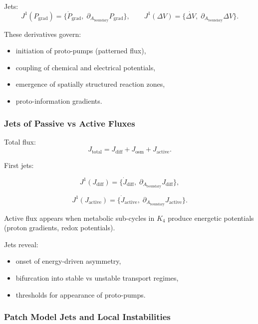 Jets:
\[
J^1(P_{\mathrm{grad}})=
\{\dot{P}_{\mathrm{grad}},\;\partial_{A_{\mathrm{boundary}}}P_{\mathrm{grad}}\},
\qquad
J^1(\Delta V)=
\{\dot{\Delta V},\;\partial_{A_{\mathrm{boundary}}}\Delta V\}.
\]

These derivatives govern:

\begin{itemize}
    \item initiation of proto-pumps (patterned flux),
    \item coupling of chemical and electrical potentials,
    \item emergence of spatially structured reaction zones,
    \item proto-information gradients.
\end{itemize}


\subsubsection{Jets of Passive vs Active Fluxes}

Total flux:
\[
J_{\mathrm{total}} 
= 
J_{\mathrm{diff}} + J_{\mathrm{osm}} + J_{\mathrm{active}}.
\]

First jets:

\[
J^1(J_{\mathrm{diff}})=
\{\dot{J}_{\mathrm{diff}},\;\partial_{A_{\mathrm{boundary}}}J_{\mathrm{diff}}\},
\]

\[
J^1(J_{\mathrm{active}})=
\{\dot{J}_{\mathrm{active}},\;\partial_{A_{\mathrm{boundary}}}J_{\mathrm{active}}\}.
\]

Active flux appears when metabolic sub-cycles in $K_4$ produce energetic
potentials (proton gradients, redox potentials).

Jets reveal:

\begin{itemize}
    \item onset of energy-driven asymmetry,
    \item bifurcation into stable vs unstable transport regimes,
    \item thresholds for appearance of proto-pumps.
\end{itemize}


\subsubsection{Patch Model Jets and Local Instabilities}

